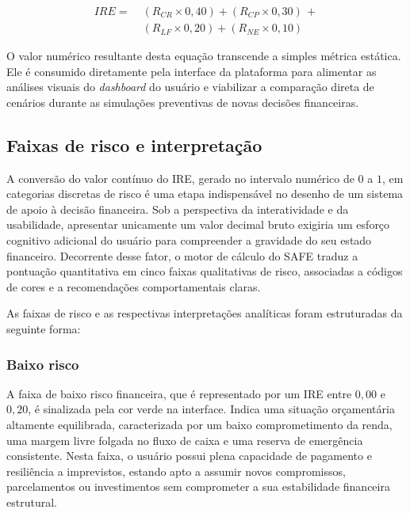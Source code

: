 \documentclass[portuguese]{sbc2025}%
\begin{document}
\begin{equation}
\begin{split}
    IRE = \; & (R_{CR} \times 0{,}40) + (R_{CP} \times 0{,}30) \, + \\
             & (R_{LF} \times 0{,}20) + (R_{NE} \times 0{,}10)
\end{split}
\end{equation}

O valor numérico resultante desta equação transcende a simples métrica estática. Ele é consumido diretamente pela interface da plataforma para alimentar as análises visuais do \textit{dashboard} do usuário e viabilizar a comparação direta de cenários durante as simulações preventivas de novas decisões financeiras.

\subsection{Faixas de risco e interpretação}

A conversão do valor contínuo do IRE, gerado no intervalo numérico de $0$ a $1$, em categorias discretas de risco é uma etapa indispensável no desenho de um sistema de apoio à decisão financeira. Sob a perspectiva da interatividade e da usabilidade, apresentar unicamente um valor decimal bruto exigiria um esforço cognitivo adicional do usuário para compreender a gravidade do seu estado financeiro. Decorrente desse fator, o motor de cálculo do SAFE traduz a pontuação quantitativa em cinco faixas qualitativas de risco, associadas a códigos de cores e a recomendações comportamentais claras.

As faixas de risco e as respectivas interpretações analíticas foram estruturadas da seguinte forma:

\subsubsection{Baixo risco}

A faixa de baixo risco financeira, que é representado por um IRE entre $0{,}00$ e $0{,}20$, é sinalizada pela cor verde na interface. Indica uma situação orçamentária altamente equilibrada, caracterizada por um baixo comprometimento da renda, uma margem livre folgada no fluxo de caixa e uma reserva de emergência consistente. Nesta faixa, o usuário possui plena capacidade de pagamento e resiliência a imprevistos, estando apto a assumir novos compromissos, parcelamentos ou investimentos sem comprometer a sua estabilidade financeira estrutural.
\end{document}
